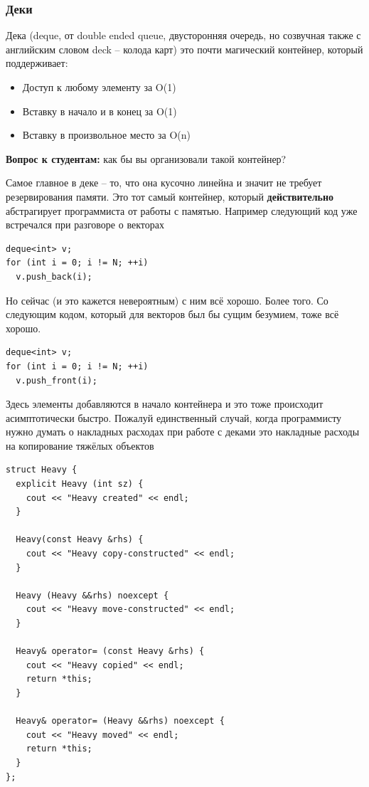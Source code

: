 \documentclass[a4paper,12pt,oneside]{article}
\newif\ifanswers
\begin{document}
\subsubsection{Деки}\label{subsub:Deque}

Дека (deque, от double ended queue, двусторонняя очередь, но созвучная также с английским словом deck -- колода карт) это почти магический контейнер, который поддерживает:

\begin{itemize}
\item Доступ к любому элементу за O(1) 
\item Вставку в начало и в конец за O(1) 
\item Вставку в произвольное место за O(n)
\end{itemize}

\textbf{Вопрос к студентам:} как бы вы организовали такой контейнер?

\ifanswers
Правильный ответ: последовательность кусков памяти фиксированного размера, связанных общей таблицей-заголовком
\fi

Самое главное в деке -- то, что она кусочно линейна и значит не требует резервирования памяти. Это тот самый контейнер, который \textbf{действительно} абстрагирует программиста от работы с памятью. Например следующий код уже встречался при разговоре о векторах

\begin{lstlisting}
deque<int> v;
for (int i = 0; i != N; ++i)
  v.push_back(i);
\end{lstlisting}

Но сейчас (и это кажется невероятным) с ним всё хорошо. Более того. Со следующим кодом, который для векторов был бы сущим безумием, тоже всё хорошо.

\begin{lstlisting}
deque<int> v;
for (int i = 0; i != N; ++i)
  v.push_front(i);
\end{lstlisting}

Здесь элементы добавляются в начало контейнера и это тоже происходит асимптотически быстро. Пожалуй единственный случай, когда программисту нужно думать о накладных расходах при работе с деками это накладные расходы на копирование тяжёлых объектов

\begin{lstlisting}
struct Heavy {
  explicit Heavy (int sz) {
    cout << "Heavy created" << endl;
  }

  Heavy(const Heavy &rhs) {
    cout << "Heavy copy-constructed" << endl;
  }

  Heavy (Heavy &&rhs) noexcept {
    cout << "Heavy move-constructed" << endl;
  }

  Heavy& operator= (const Heavy &rhs) {
    cout << "Heavy copied" << endl;
    return *this;
  }

  Heavy& operator= (Heavy &&rhs) noexcept {
    cout << "Heavy moved" << endl;
    return *this;
  }
};
\end{lstlisting}
\end{document}
